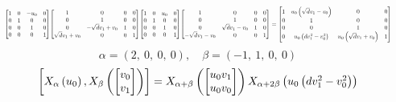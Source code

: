 \documentclass[11pt]{article}
\theoremstyle{definition}
\begin{document}
\[
\scaletoalign{\textwidth}{{\left[\begin{matrix}1 & 0 & - u_{0} & 0\\0 & 1 & 0 & 0\\0 & 0 & 1 & 0\\0 & 0 & 0 & 1\end{matrix}\right]} {\left[\begin{matrix}1 & 0 & 0 & 0\\0 & 1 & 0 & 0\\0 & - \sqrt{d} v_{1} + v_{0} & 1 & 0\\\sqrt{d} v_{1} + v_{0} & 0 & 0 & 1\end{matrix}\right]} {\left[\begin{matrix}1 & 0 & u_{0} & 0\\0 & 1 & 0 & 0\\0 & 0 & 1 & 0\\0 & 0 & 0 & 1\end{matrix}\right]} {\left[\begin{matrix}1 & 0 & 0 & 0\\0 & 1 & 0 & 0\\0 & \sqrt{d} v_{1} - v_{0} & 1 & 0\\- \sqrt{d} v_{1} - v_{0} & 0 & 0 & 1\end{matrix}\right]} = {\left[\begin{matrix}1 & u_{0} \left(\sqrt{d} v_{1} - v_{0}\right) & 0 & 0\\0 & 1 & 0 & 0\\0 & 0 & 1 & 0\\0 & u_{0} \left(d v_{1}^{2} - v_{0}^{2}\right) & u_{0} \left(\sqrt{d} v_{1} + v_{0}\right) & 1\end{matrix}\right]}}
\]
\[
\alpha = \left( 2, \  0, \  0, \  0\right), \quad \beta = \left( -1, \  1, \  0, \  0\right)
\]
\[
\scaletoalign{\textwidth}{\left[ X_{\alpha}\left(u_{0}\right), X_{\beta}\left(\left[\begin{matrix}v_{0}\\v_{1}\end{matrix}\right]\right) \right] = X_{\alpha + \beta}\left(\left[\begin{matrix}u_{0} v_{1}\\u_{0} v_{0}\end{matrix}\right]\right) X_{\alpha + 2\beta}\left(u_{0} \left(d v_{1}^{2} - v_{0}^{2}\right)\right)}
\]
\end{document}
